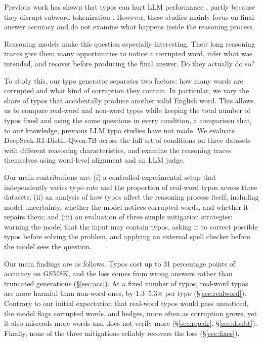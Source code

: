 \documentclass[11pt]{article}
\begin{document}
Previous work has shown that typos can hurt LLM performance
\citep{gan2024,zhao2026}, partly because they disrupt subword tokenization
\citep{chai2024}. However, these
studies mainly focus on final-answer accuracy and do not examine what happens
inside the reasoning process.

Reasoning models make this question especially interesting. Their long reasoning
traces give them many opportunities to notice a corrupted word, infer what was
intended, and recover before producing the final answer. Do they actually do so?

To study this, our typo generator separates two factors: how many words are
corrupted and what kind of corruption they contain. In particular, we vary the
share of typos that accidentally produce another valid English word. This allows
us to compare real-word and non-word typos while keeping the total number of
typos fixed and using the same questions in every condition, a comparison that,
to our knowledge, previous LLM typo studies have not made. We evaluate
DeepSeek-R1-Distill-Qwen-7B \citep{deepseekr1} across the full set of conditions
on three datasets with different reasoning characteristics, and examine the
reasoning traces themselves using word-level alignment and an LLM judge.

Our main contributions are: (i) a controlled experimental setup that
independently varies typo rate and the proportion of real-word typos across
three datasets; (ii) an analysis of how typos affect the reasoning process
itself, including model uncertainty, whether the model notices corrupted words,
and whether it repairs them; and (iii) an evaluation of three simple mitigation
strategies: warning the model that the input may contain typos, asking it to
correct possible typos before solving the problem, and applying an external
spell checker before the model sees the question.

Our main findings are as follows. Typos cost up to 31 percentage points of
accuracy on GSM8K, and the loss comes from wrong answers rather than truncated
generations (\S\ref{sec:acc}). At a fixed number of typos, real-word typos are
more harmful than non-word ones, by 1.3--5.3$\times$ per typo
(\S\ref{sec:realword}). Contrary to our initial expectation that real-word
typos would pass unnoticed, the model flags corrupted words, and hedges, more
often as corruption grows, yet it also misreads more words and does not verify
more (\S\ref{sec:repair}, \S\ref{sec:doubt}). Finally, none of the three
mitigations reliably recovers the loss (\S\ref{sec:fixes}).
\end{document}
